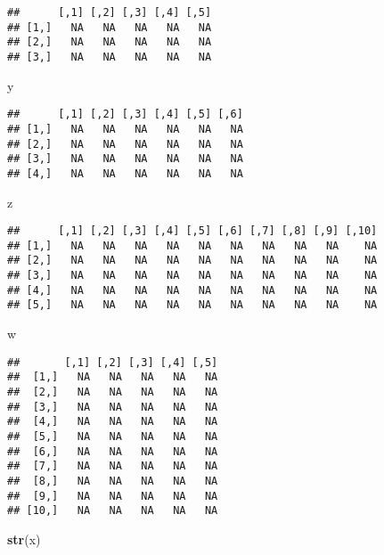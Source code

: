 \documentclass[]{article}
\newenvironment{Shaded}{\begin{snugshade}}{\end{snugshade}}
\newcommand{\KeywordTok}[1]{\textcolor[rgb]{0.13,0.29,0.53}{\textbf{#1}}}
\newcommand{\NormalTok}[1]{#1}
\begin{document}
\begin{verbatim}
##      [,1] [,2] [,3] [,4] [,5]
## [1,]   NA   NA   NA   NA   NA
## [2,]   NA   NA   NA   NA   NA
## [3,]   NA   NA   NA   NA   NA
\end{verbatim}

\begin{Shaded}
\begin{Highlighting}[]
\NormalTok{y}
\end{Highlighting}
\end{Shaded}

\begin{verbatim}
##      [,1] [,2] [,3] [,4] [,5] [,6]
## [1,]   NA   NA   NA   NA   NA   NA
## [2,]   NA   NA   NA   NA   NA   NA
## [3,]   NA   NA   NA   NA   NA   NA
## [4,]   NA   NA   NA   NA   NA   NA
\end{verbatim}

\begin{Shaded}
\begin{Highlighting}[]
\NormalTok{z}
\end{Highlighting}
\end{Shaded}

\begin{verbatim}
##      [,1] [,2] [,3] [,4] [,5] [,6] [,7] [,8] [,9] [,10]
## [1,]   NA   NA   NA   NA   NA   NA   NA   NA   NA    NA
## [2,]   NA   NA   NA   NA   NA   NA   NA   NA   NA    NA
## [3,]   NA   NA   NA   NA   NA   NA   NA   NA   NA    NA
## [4,]   NA   NA   NA   NA   NA   NA   NA   NA   NA    NA
## [5,]   NA   NA   NA   NA   NA   NA   NA   NA   NA    NA
\end{verbatim}

\begin{Shaded}
\begin{Highlighting}[]
\NormalTok{w}
\end{Highlighting}
\end{Shaded}

\begin{verbatim}
##       [,1] [,2] [,3] [,4] [,5]
##  [1,]   NA   NA   NA   NA   NA
##  [2,]   NA   NA   NA   NA   NA
##  [3,]   NA   NA   NA   NA   NA
##  [4,]   NA   NA   NA   NA   NA
##  [5,]   NA   NA   NA   NA   NA
##  [6,]   NA   NA   NA   NA   NA
##  [7,]   NA   NA   NA   NA   NA
##  [8,]   NA   NA   NA   NA   NA
##  [9,]   NA   NA   NA   NA   NA
## [10,]   NA   NA   NA   NA   NA
\end{verbatim}

\begin{Shaded}
\begin{Highlighting}[]
\KeywordTok{str}\NormalTok{(x)}
\end{Highlighting}
\end{Shaded}
\end{document}
